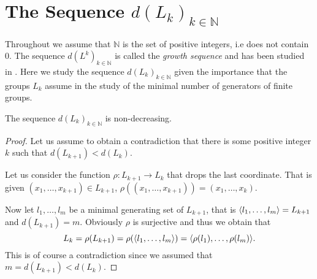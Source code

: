 \section{The Sequence \texorpdfstring{$d(L_k)_{k \in \mathbb{N}}$}{dLkN}}

Throughout we assume that $\mathbb{N}$ is the set of positive integers, i.e does not contain $0$.
The sequence $d(L^k)_{k \in \mathbb{N}}$ is called the \textit{growth sequence} and has been studied in \cite{WiegoldGSFG, WiegoldGSFGII, WiegoldGSFGIII, WiegoldGSFGIV}. Here we study the sequence $d(L_k)_{k \in \mathbb{N}}$ given the importance that the groups $L_k$ assume in the study of the minimal number of generators of finite groups. 

\begin{theorem}
    \label{S2:nondecLk}
    The sequence $d(L_k)_{k \in \mathbb{N}}$ is non-decreasing.
\end{theorem}

\begin{proof}
    Let us assume to obtain a contradiction that there is some positive integer $k$ such that $d(L_{k+1}) < d(L_k)$. 
    
    Let us consider the function $\rho: L_{k+1} \rightarrow L_k$ that drops the last coordinate. That is given $(x_1,\ldots ,x_{k+1}) \in L_{k+1}$, $\rho((x_1,\ldots ,x_{k+1})) = (x_1,\ldots ,x_k)$.

    Now let $l_1,\ldots ,l_m$ be a minimal generating set of $L_{k+1}$, that is $
    \langle l_1,\ldots ,l_m \rangle = L_{k+1}$ and $d(L_{k+1}) = m$.
    Obviously $\rho$ is surjective and thus we obtain that 
    $$
    L_k = \rho(L_{k+1}) = \rho(\langle l_1,\ldots ,l_m \rangle) = \langle \rho(l_1),\ldots ,\rho(l_m) \rangle.
    $$
    This is of course a contradiction since we assumed that $m = d(L_{k+1}) < d(L_k)$.
\end{proof}

